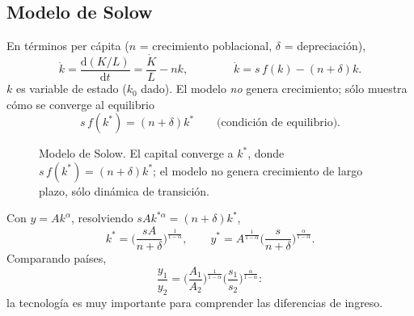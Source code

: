 \documentclass[11pt]{article}
\theoremstyle{definition}
\begin{document}
\subsection{Modelo de Solow}

En términos per cápita ($n$ = crecimiento poblacional, $\delta$ = depreciación),
\begin{equation}
\dot{k}=\frac{\mathrm{d}(K/L)}{\mathrm{d}t}=\frac{\dot{K}}{L}-nk,
\qquad\qquad
\dot{k}=s\,f(k)-(n+\delta)k .
\end{equation}
$k$ es variable de estado ($k_{0}$ dado). El modelo \emph{no} genera crecimiento; sólo muestra cómo
se converge al equilibrio
\begin{equation}
s\,f(k^{\ast})=(n+\delta)k^{\ast}\qquad\text{(condición de equilibrio).}
\end{equation}

\begin{figure}[h]
\centering
{}
\caption{Modelo de Solow. El capital converge a $k^{\ast}$, donde $s\,f(k^{\ast})=(n+\delta)k^{\ast}$;
el modelo no genera crecimiento de largo plazo, sólo dinámica de transición.}
\end{figure}

Con $y=Ak^{\alpha}$, resolviendo $sAk^{\ast\alpha}=(n+\delta)k^{\ast}$,
\begin{equation}
k^{\ast}=\Big(\frac{sA}{n+\delta}\Big)^{\frac{1}{1-\alpha}},
\qquad
y^{\ast}=A^{\frac{1}{1-\alpha}}\Big(\frac{s}{n+\delta}\Big)^{\frac{\alpha}{1-\alpha}} .
\end{equation}
Comparando países,
\begin{equation}
\frac{y_{1}}{y_{2}}=\Big(\frac{A_{1}}{A_{2}}\Big)^{\frac{1}{1-\alpha}}\Big(\frac{s_{1}}{s_{2}}\Big)^{\frac{\alpha}{1-\alpha}} :
\end{equation}
la tecnología es muy importante para comprender las diferencias de ingreso.
\end{document}
